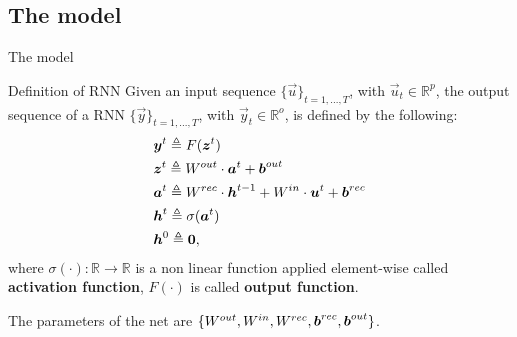 
\subsection{The model}
\begin{frame}{The model}
	
\begin{block}{Definition of RNN}
	Given an input sequence $\{\vec{u}\}_{t=1,...,T}$, with $ \vec{u}_t \in \mathbb{R}^p$, the output sequence of a RNN $\{\vec{y}\}_{t=1,...,T}$, with $\vec{y}_t \in \mathbb{R}^o$,  is defined by the following:
\begin{align}
		&\boldsymbol{y}^t \triangleq F(\boldsymbol{z}^t)\\
		&\boldsymbol{z}^t \triangleq W^{out}\cdot\boldsymbol{a}^t + \boldsymbol{b}^{out}\\
		&\boldsymbol{a}^t \triangleq W^{rec}\cdot\boldsymbol{h}^{t-1}+W^{in}\cdot\boldsymbol{u}^t+\boldsymbol{b}^{rec}\\
		&\boldsymbol{h}^t \triangleq  \sigma(\boldsymbol{a}^t) \\
		&\boldsymbol{h}^0 \triangleq \boldsymbol{0},
\end{align}
where $\sigma(\cdot):\mathbb{R}\rightarrow\mathbb{R}$ is a non linear function applied element-wise called \textbf{activation function}, $F(\cdot)$ is called \textbf{output function}. 
\end{block}

\begin{block}{}
	The parameters of the net are $\{W^{out}, W^{in},  W^{rec}, \boldsymbol{b}^{rec}, \boldsymbol{b}^{out}\}$.
\end{block}
\end{frame}

